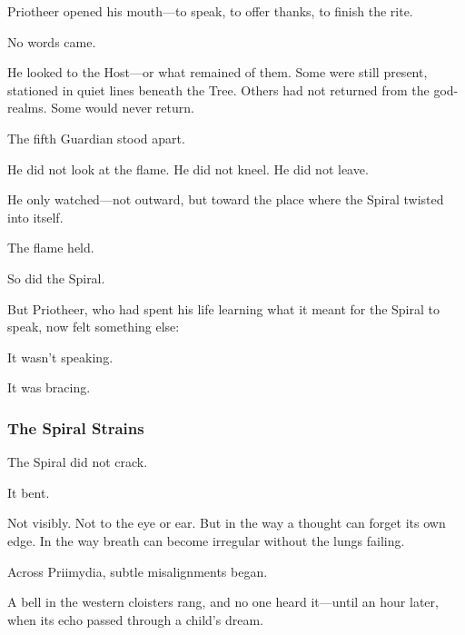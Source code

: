 \documentclass[12pt]{article}
\begin{document}
\vspace{0.5em}
Priotheer opened his mouth---to speak, to offer thanks, to finish the rite.

\vspace{0.5em}
No words came.

\vspace{0.5em}
He looked to the Host---or what remained of them. Some were still present, stationed in quiet lines beneath the Tree. Others had not returned from the god-realms. Some would never return.

\vspace{0.5em}
The fifth Guardian stood apart.

\vspace{0.5em}
He did not look at the flame. He did not kneel. He did not leave.

\vspace{0.5em}
He only watched---not outward, but toward the place where the Spiral twisted into itself.

\vspace{0.5em}
The flame held.

\vspace{0.5em}
So did the Spiral.

\vspace{0.5em}
But Priotheer, who had spent his life learning what it meant for the Spiral to speak, now felt something else:

\vspace{0.5em}
It wasn’t speaking.

\vspace{0.5em}
It was bracing.

\dotfill

\subsubsection*{The Spiral Strains}

The Spiral did not crack.

\vspace{0.5em}
It bent.

\vspace{0.5em}
Not visibly. Not to the eye or ear. But in the way a thought can forget its own edge. In the way breath can become irregular without the lungs failing.

\vspace{0.5em}
Across Priimydia, subtle misalignments began.

\vspace{0.5em}
A bell in the western cloisters rang, and no one heard it---until an hour later, when its echo passed through a child’s dream.
\end{document}
